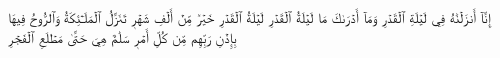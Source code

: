 إِنَّآ أَنزَلۡنَٰهُ فِي لَيۡلَةِ ٱلۡقَدۡرِ
وَمَآ أَدۡرَىٰكَ مَا لَيۡلَةُ ٱلۡقَدۡرِ
لَيۡلَةُ ٱلۡقَدۡرِ خَيۡرٞ مِّنۡ أَلۡفِ شَهۡرٖ
تَنَزَّلُ ٱلۡمَلَـٰٓئِكَةُ وَٱلرُّوحُ فِيهَا بِإِذۡنِ رَبِّهِم مِّن كُلِّ أَمۡرٖ
سَلَٰمٌ هِيَ حَتَّىٰ مَطۡلَعِ ٱلۡفَجۡرِ